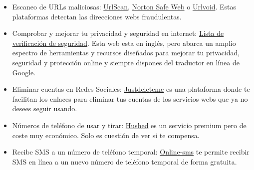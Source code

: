 \documentclass[
  a4paper,
  openany]{book}
\begin{document}
\begin{itemize}
  \begin{itemize}
  \item
    Emails temporales: Si solo necesitas registrarte en una web para un recurso puntual, como por ejemplo descargarte un eBook, puedes utilizar \href{https://temp-mail.org/es/}{Temporay email}, \href{https://tempmailo.com/}{TempMailo} o \href{https://temp-mail.io/es}{Tempmail} y no son los únicos servicios de este tipo, en el siguiente enlace tienes una lista más amplia de \href{https://www.genbeta.com/correo/7-servicios-de-email-temporales-para-evitar-spam-y-otros-problemas}{servicios de correos temporales}. Y si usas el navegador Firefox, podrás tener este mismo servicio integrado en el propio navegador con solo la instalación del plugin \href{https://relay.firefox.com}{Relay firefox}.
  \item
    Emails anónimos: Con \href{https://www.secure-email.org/index.php}{Secure email} puedes enviar correos electrónicos y SMS anónimos, falsificar el número del remitente de SMS y muchos más.
  \item
    Modificar el alias o identidad del email: \href{https://simplelogin.io/}{Simple login} es un servicio con el que puedes crear tus alias o identidades para ocultar tu email personal, evitar spam y mantener tu privacidad.
  \end{itemize}
\item
  Escaneo de URLs maliciosas: \href{https://urlscan.io/}{UrlScan}, \href{https://safeweb.norton.com/}{Norton Safe Web} o \href{https://www.urlvoid.com/}{Urlvoid}. Estas plataformas detectan las direcciones webs fraudulentas.
\item
  Comprobar y mejorar tu privacidad y seguridad en internet: \href{https://securitycheckli.st/}{Lista de verificación de seguridad}. Esta web esta en inglés, pero abarca un amplio espectro de herramientas y recursos diseñados para mejorar tu privacidad, seguridad y protección online y siempre dispones del traductor en línea de Google.
\item
  Eliminar cuentas en Redes Sociales: \href{https://justdeleteme.xyz/}{Justdeleteme} es una plataforma donde te facilitan los enlaces para eliminar tus cuentas de los servicios webs que ya no desees seguir usando.
\item
  Números de teléfono de usar y tirar: \href{https://hushed.com}{Hushed} es un servicio premium pero de coste muy económico. Solo es cuestión de ver si te compensa.
\item
  Recibe SMS a un número de teléfono temporal: \href{https://online-sms.org/es}{Online-sms} te permite recibir SMS en línea a un nuevo número de teléfono temporal de forma gratuita.

\end{itemize}
\end{document}
